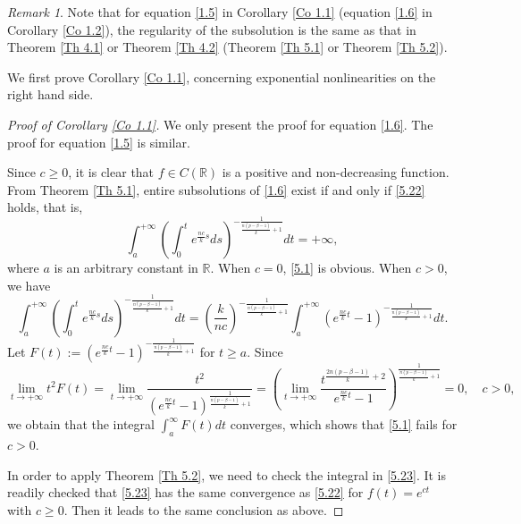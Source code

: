 \documentclass[a4paper,11pt]{amsart}
\theoremstyle{plain}
\theoremstyle{remark}
\newtheorem{remark}{Remark}
\numberwithin{equation}{section}
\numberwithin{figure}{section}
\numberwithin{remark}{section}
\begin{document}
\begin{sloppypar}
\begin{remark}\label{Re 6.7}
Note that for equation \eqref{1.5} in Corollary \ref{Co 1.1} (equation \eqref{1.6} in Corollary \ref{Co 1.2}), the regularity of the subsolution is the same as that in Theorem \ref{Th 4.1} or Theorem \ref{Th 4.2}  (Theorem \ref{Th 5.1} or Theorem \ref{Th 5.2}).
\end{remark}


We first prove Corollary \ref{Co 1.1}, concerning exponential nonlinearities on the right hand side.
\begin{proof}[Proof of Corollary \ref{Co 1.1}]
We only present the proof for equation \eqref{1.6}. The proof for equation \eqref{1.5} is similar.

Since $c\geq0$, it is clear that $f\in C(\mathbb{R})$ is a positive and non-decreasing function. From Theorem \ref{Th 5.1}, entire subsolutions of \eqref{1.6} exist if and only if \eqref{5.22} holds, that is,
\begin{equation}\label{5.1}
	\int_a^{+\infty}\left( \int_{0}^{t}e^{\frac{nc}{k}s}ds\right)^{-\frac{1}{\frac{n(p-\beta -1)}{k}+1}}dt=+\infty,
\end{equation}where $a$ is an arbitrary constant in $\mathbb{R}$.
When $c=0$, \eqref{5.1} is obvious.
When $c>0$, we have
\begin{equation*}
	\int_a^{+\infty}\left( \int_{0}^{t}e^{\frac{nc}{k}s}ds\right) ^{-\frac{1}{\frac{n(p-\beta -1)}{k}+1}}dt=\left(\frac{k}{nc}\right)^{-\frac{1}{\frac{n(p-\beta -1)}{k}+1}}\int_a^{+\infty}(e^{\frac{nc}{k}t}-1) ^{-\frac{1}{\frac{n(p-\beta -1)}{k}+1}}dt.
\end{equation*}
Let $F(t):=(e^{\frac{nc}{k}t}-1)^{-\frac{1}{\frac{n(p-\beta -1)}{k}+1}}$ for $t\geq a$.
Since
\begin{equation*}
	\lim_{t\to +\infty}t^2F(t)=	
	\lim_{t\to +\infty}\frac{t^2}{(e^{\frac{nc}{k}t}-1)^{\frac{1}{\frac{n(p-\beta -1)}{k}+1}}}
	=\left( \lim_{t\to +\infty}\frac{t^{\frac{2n(p-\beta -1)}{k}+2}}{e^{\frac{nc}{k}t}-1}\right) ^{\frac{1}{\frac{n(p-\beta -1)}{k}+1}}=0,\quad c>0,
\end{equation*}
we obtain that the integral $\int_a^\infty F(t)dt$ converges, which shows that \eqref{5.1} fails for $c>0$.

\vspace{1mm}

In order to apply Theorem \ref{Th 5.2}, we need to check the integral in \eqref{5.23}. It is readily checked that \eqref{5.23} has the same convergence as \eqref{5.22} for $f(t)=e^{c t}$ with $c\ge 0$. Then it leads to the same conclusion as above.
\end{proof}


\end{sloppypar}
\end{document}
